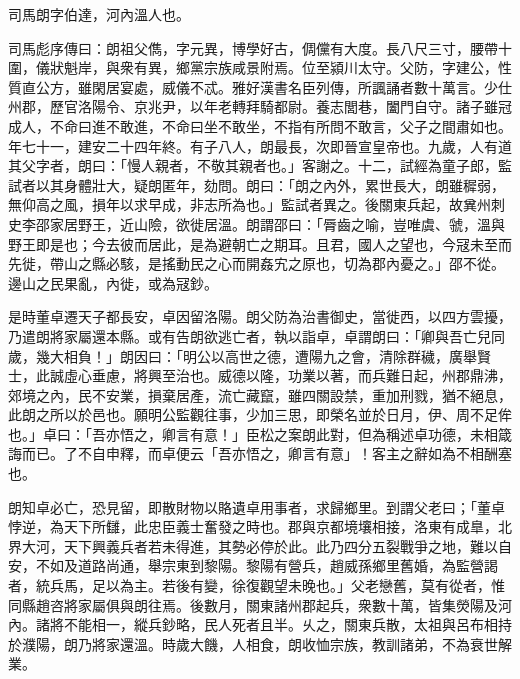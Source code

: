 
\begin{pinyinscope}
司馬朗字伯達，河內溫人也。

司馬彪序傳曰：朗祖父儁，字元異，博學好古，倜儻有大度。長八尺三寸，腰帶十圍，儀狀魁岸，與衆有異，鄉黨宗族咸景附焉。位至潁川太守。父防，字建公，性質直公方，雖閑居宴處，威儀不忒。雅好漢書名臣列傳，所諷誦者數十萬言。少仕州郡，歷官洛陽令、京兆尹，以年老轉拜騎都尉。養志閭巷，闔門自守。諸子雖冠成人，不命曰進不敢進，不命曰坐不敢坐，不指有所問不敢言，父子之間肅如也。年七十一，建安二十四年終。有子八人，朗最長，次即晉宣皇帝也。九歲，人有道其父字者，朗曰：「慢人親者，不敬其親者也。」客謝之。十二，試經為童子郎，監試者以其身體壯大，疑朗匿年，劾問。朗曰：「朗之內外，累世長大，朗雖穉弱，無仰高之風，損年以求早成，非志所為也。」監試者異之。後關東兵起，故兾州刺史李邵家居野王，近山險，欲徙居溫。朗謂邵曰：「脣齒之喻，豈唯虞、虢，溫與野王即是也；今去彼而居此，是為避朝亡之期耳。且君，國人之望也，今冦未至而先徙，帶山之縣必駭，是搖動民之心而開姦宄之原也，切為郡內憂之。」邵不從。邊山之民果亂，內徙，或為冦鈔。

是時董卓遷天子都長安，卓因留洛陽。朗父防為治書御史，當徙西，以四方雲擾，乃遣朗將家屬還本縣。或有告朗欲逃亡者，執以詣卓，卓謂朗曰：「卿與吾亡兒同歲，幾大相負！」朗因曰：「明公以高世之德，遭陽九之會，清除群穢，廣舉賢士，此誠虛心垂慮，將興至治也。威德以隆，功業以著，而兵難日起，州郡鼎沸，郊境之內，民不安業，損棄居產，流亡藏竄，雖四關設禁，重加刑戮，猶不絕息，此朗之所以於邑也。願明公監觀往事，少加三思，即榮名並於日月，伊、周不足侔也。」卓曰：「吾亦悟之，卿言有意！」臣松之案朗此對，但為稱述卓功德，未相箴誨而已。了不自申釋，而卓便云「吾亦悟之，卿言有意」！客主之辭如為不相酬塞也。

朗知卓必亡，恐見留，即散財物以賂遺卓用事者，求歸鄉里。到謂父老曰；「董卓悖逆，為天下所讎，此忠臣義士奮發之時也。郡與京都境壤相接，洛東有成臯，北界大河，天下興義兵者若未得進，其勢必停於此。此乃四分五裂戰爭之地，難以自安，不如及道路尚通，舉宗東到黎陽。黎陽有營兵，趙威孫鄉里舊婚，為監營謁者，統兵馬，足以為主。若後有變，徐復觀望未晚也。」父老戀舊，莫有從者，惟同縣趙咨將家屬俱與朗往焉。後數月，關東諸州郡起兵，衆數十萬，皆集熒陽及河內。諸將不能相一，縱兵鈔略，民人死者且半。乆之，關東兵散，太祖與呂布相持於濮陽，朗乃將家還溫。時歲大饑，人相食，朗收恤宗族，教訓諸弟，不為衰世解業。


\end{pinyinscope}
